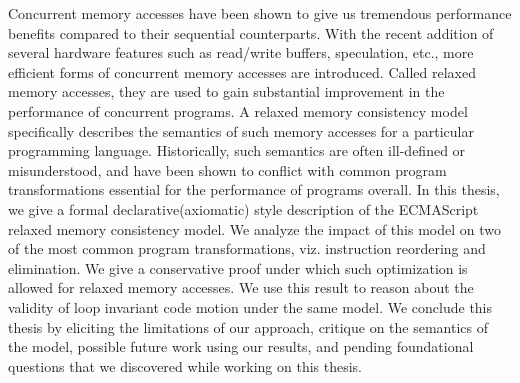 Concurrent memory accesses have been shown to give us tremendous performance benefits compared to their sequential counterparts.
With the recent addition of several hardware features such as read/write buffers, speculation, etc., more efficient forms of concurrent memory accesses are introduced.
Called relaxed memory accesses, they are used to gain substantial improvement in the performance of concurrent programs. 
A relaxed memory consistency model specifically describes the semantics of such memory accesses for a particular programming language. 
Historically, such semantics are often ill-defined or misunderstood, and have been shown to conflict with common program transformations essential for the performance of programs overall. 
In this thesis, we give a formal declarative(axiomatic) style description of the ECMAScript relaxed memory consistency model. 
We analyze the impact of this model on two of the most common program transformations, viz. instruction reordering and elimination. 
We give a conservative proof under which such optimization is allowed for relaxed memory accesses. 
We use this result to reason about the validity of loop invariant code motion under the same model. 
We conclude this thesis by eliciting the limitations of our approach, critique on the semantics of the model, possible future work using our results, and pending foundational questions that we discovered while working on this thesis.